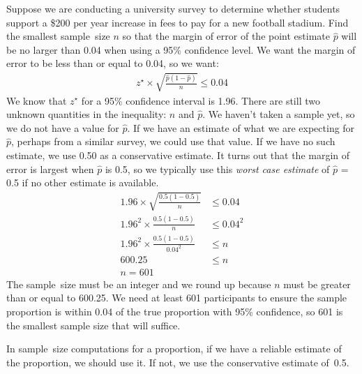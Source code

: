 \begin{examplewrap}
\begin{nexample}{Suppose we are conducting a university survey to determine whether students support a \$200 per year increase in fees to pay for a new football stadium.  Find the smallest sample~size $n$ so that the margin of error of the point estimate $\hat{p}$ will be no larger than 0.04 when using a 95\% confidence level.}
We want the margin of error to be less than or equal to 0.04, so we want:
\begin{align*}
z^{\star}\times \sqrt{\frac{\hat{p}(1-\hat{p})}{n}} \leq 0.04
\end{align*}
We know that $z^{\star}$ for a 95\% confidence interval is 1.96.  There are still two unknown quantities in the inequality: $n$ and $\hat{p}$. We haven't taken a sample yet, so we do not have a value for $\hat{p}$.  If we have an estimate of what we are expecting for $\hat{p}$, perhaps from a similar survey, we could use that value. If we have no such estimate, we use 0.50 as a conservative estimate. It turns out that the margin of error is largest when $\hat{p}$ is 0.5, so we typically use this \emph{worst case estimate} of $\hat{p}$ = 0.5 if no other estimate is available.
\begin{align*}
	1.96\times \sqrt{\frac{0.5(1-0.5)}{n}} &\leq 0.04 \\
	1.96^2\times \frac{0.5(1-0.5)}{n} &\leq 0.04^2 \\
	1.96^2\times \frac{0.5(1-0.5)}{0.04^2} &\leq n \\
	600.25 &\leq n \\
	n=601
\end{align*}
The sample~size must be an integer and we round up because $n$ must be greater than or equal to 600.25. We need at least 601 participants to ensure the sample proportion is within 0.04 of the true proportion with 95\% confidence, so 601 is the smallest sample size that will suffice.
\end{nexample}
\end{examplewrap}

In sample~size computations for a proportion, if we have a reliable estimate of the proportion, we should use it.  If not, we use the conservative estimate of~0.5.



 


